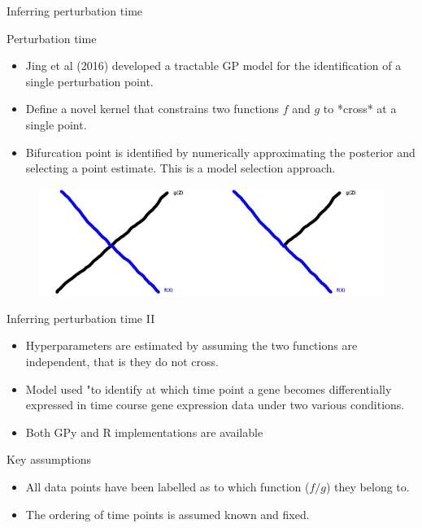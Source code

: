 \documentclass[ignorenonframetext]{beamer}
\begin{document}
\begin{frame}{Inferring perturbation time}
	 \begin{block}{Perturbation time}
		\begin{itemize}
\item Jing et al (2016) developed a tractable GP model for the identification of a single perturbation point.
\item Define a novel kernel that constrains two functions $f$ and $g$ to *cross* at a single point.
\item Bifurcation point is identified by numerically approximating the posterior and selecting a point estimate. This is a model selection approach.
		\end{itemize}
    \begin{figure}
    \centering
    \includegraphics[width=.65\textwidth]{crossingKernel}
    \end{figure}
  \end{block}
\end{frame}

\begin{frame}{Inferring perturbation time II}
\begin{itemize}
\item Hyperparameters are estimated by assuming the two functions are independent, that is they do not cross.
\item Model used "to identify at which time point a gene becomes differentially expressed in time course gene expression data under two various conditions.
\item Both GPy and R implementations are available
\end{itemize}

\begin{block}{Key assumptions}
\begin{itemize}
\item All data points have been labelled as to which function ($f/g$) they belong to.
\item The ordering of time points is assumed known and fixed.
\end{itemize}
\end{block}
\end{frame}
\end{document}
